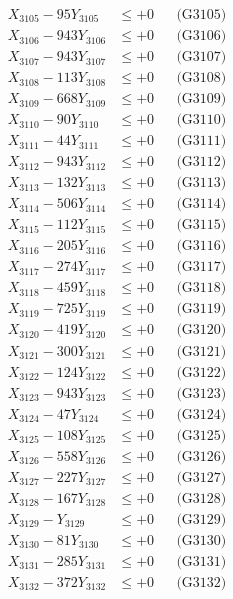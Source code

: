 \documentclass[a4paper,10pt]{article}
\begin{document}
{\begin{align}
X_{3105} - 95Y_{3105} &\leq +0 && \text{(G3105)} \\
X_{3106} - 943Y_{3106} &\leq +0 && \text{(G3106)} \\
X_{3107} - 943Y_{3107} &\leq +0 && \text{(G3107)} \\
X_{3108} - 113Y_{3108} &\leq +0 && \text{(G3108)} \\
X_{3109} - 668Y_{3109} &\leq +0 && \text{(G3109)} \\
X_{3110} - 90Y_{3110} &\leq +0 && \text{(G3110)} \\
\allowbreak
X_{3111} - 44Y_{3111} &\leq +0 && \text{(G3111)} \\
X_{3112} - 943Y_{3112} &\leq +0 && \text{(G3112)} \\
X_{3113} - 132Y_{3113} &\leq +0 && \text{(G3113)} \\
X_{3114} - 506Y_{3114} &\leq +0 && \text{(G3114)} \\
X_{3115} - 112Y_{3115} &\leq +0 && \text{(G3115)} \\
X_{3116} - 205Y_{3116} &\leq +0 && \text{(G3116)} \\
X_{3117} - 274Y_{3117} &\leq +0 && \text{(G3117)} \\
X_{3118} - 459Y_{3118} &\leq +0 && \text{(G3118)} \\
X_{3119} - 725Y_{3119} &\leq +0 && \text{(G3119)} \\
X_{3120} - 419Y_{3120} &\leq +0 && \text{(G3120)} \\
\allowbreak
X_{3121} - 300Y_{3121} &\leq +0 && \text{(G3121)} \\
X_{3122} - 124Y_{3122} &\leq +0 && \text{(G3122)} \\
X_{3123} - 943Y_{3123} &\leq +0 && \text{(G3123)} \\
X_{3124} - 47Y_{3124} &\leq +0 && \text{(G3124)} \\
X_{3125} - 108Y_{3125} &\leq +0 && \text{(G3125)} \\
X_{3126} - 558Y_{3126} &\leq +0 && \text{(G3126)} \\
X_{3127} - 227Y_{3127} &\leq +0 && \text{(G3127)} \\
X_{3128} - 167Y_{3128} &\leq +0 && \text{(G3128)} \\
X_{3129} - Y_{3129} &\leq +0 && \text{(G3129)} \\
X_{3130} - 81Y_{3130} &\leq +0 && \text{(G3130)} \\
\allowbreak
X_{3131} - 285Y_{3131} &\leq +0 && \text{(G3131)} \\
X_{3132} - 372Y_{3132} &\leq +0 && \text{(G3132)} \\

\end{align}}
\end{document}
